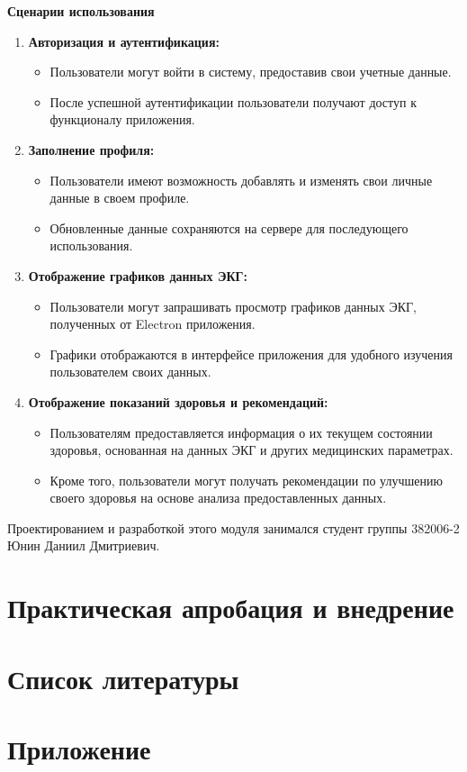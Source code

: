 \documentclass[12pt, russian]{extarticle}
\begin{document}
\begin{spacing}{1.5}
\par \noindent \textbf{Сценарии использования}

\begin{enumerate}
    \item \textbf{Авторизация и аутентификация:}
    \begin{itemize}
        \item Пользователи могут войти в систему, предоставив свои учетные данные.
        \item После успешной аутентификации пользователи получают доступ к функционалу приложения.
    \end{itemize}

    \item \textbf{Заполнение профиля:}
    \begin{itemize}
        \item Пользователи имеют возможность добавлять и изменять свои личные данные в своем профиле.
        \item Обновленные данные сохраняются на сервере для последующего использования.
    \end{itemize}

    \item \textbf{Отображение графиков данных ЭКГ:}
    \begin{itemize}
        \item Пользователи могут запрашивать просмотр графиков данных ЭКГ, полученных от Electron приложения.
        \item Графики отображаются в интерфейсе приложения для удобного изучения пользователем своих данных.
    \end{itemize}

    \item \textbf{Отображение показаний здоровья и рекомендаций:}
    \begin{itemize}
        \item Пользователям предоставляется информация о их текущем состоянии здоровья, основанная на данных ЭКГ и других медицинских параметрах.
        \item Кроме того, пользователи могут получать рекомендации по улучшению своего здоровья на основе анализа предоставленных данных.
    \end{itemize}
\end{enumerate}

Проектированием и разработкой этого модуля занимался студент группы 382006-2 Юнин Даниил Дмитриевич.

\newpage
\section{Практическая апробация и внедрение}

\newpage
\section{Список литературы}


\newpage
\section{Приложение}

\end{spacing}
\end{document}
